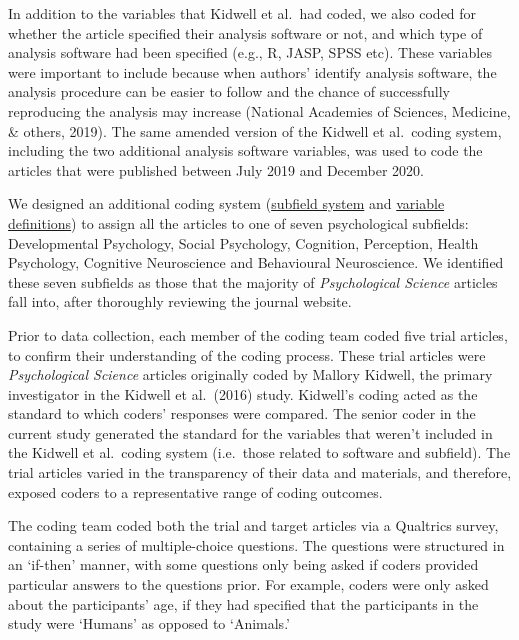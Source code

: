 \documentclass[
  english,
  man,floatsintext]{apa6}
\begin{document}
In addition to the variables that Kidwell et al.~had coded, we also coded for whether the article specified their analysis software or not, and which type of analysis software had been specified (e.g., R, JASP, SPSS etc). These variables were important to include because when authors' identify analysis software, the analysis procedure can be easier to follow and the chance of successfully reproducing the analysis may increase (National Academies of Sciences, Medicine, \& others, 2019).
The same amended version of the Kidwell et al.~coding system, including the two additional analysis software variables, was used to code the articles that were published between July 2019 and December 2020.

We designed an additional coding system (\href{https://osf.io/a9vgr/?view_only=b97cd4c4f6d645bc9e8870d97b6f3da4}{subfield system} and \href{https://osf.io/md5eu/?view_only=b97cd4c4f6d645bc9e8870d97b6f3da4}{variable definitions}) to assign all the articles to one of seven psychological subfields: Developmental Psychology, Social Psychology, Cognition, Perception, Health Psychology, Cognitive Neuroscience and Behavioural Neuroscience. We identified these seven subfields as those that the majority of \emph{Psychological Science} articles fall into, after thoroughly reviewing the journal website.

Prior to data collection, each member of the coding team coded five trial articles, to confirm their understanding of the coding process. These trial articles were \emph{Psychological Science} articles originally coded by Mallory Kidwell, the primary investigator in the Kidwell et al.~(2016) study. Kidwell's coding acted as the standard to which coders' responses were compared. The senior coder in the current study generated the standard for the variables that weren't included in the Kidwell et al.~coding system (i.e.~those related to software and subfield). The trial articles varied in the transparency of their data and materials, and therefore, exposed coders to a representative range of coding outcomes.

The coding team coded both the trial and target articles via a Qualtrics survey, containing a series of multiple-choice questions. The questions were structured in an `if-then' manner, with some questions only being asked if coders provided particular answers to the questions prior. For example, coders were only asked about the participants' age, if they had specified that the participants in the study were `Humans' as opposed to `Animals.'
\end{document}

